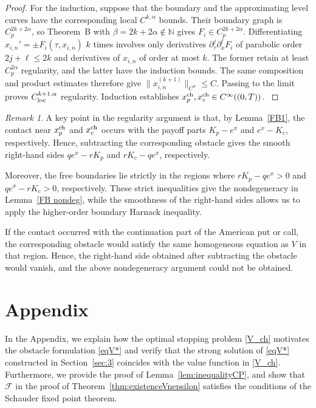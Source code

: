 \documentclass[11pt, a4paper, leqno]{amsart}
\numberwithin{equation}{section}
\theoremstyle{plain}
\theoremstyle{definition}
\theoremstyle{remark}
\newtheorem{remark}[theorem]{Remark}
\def\leq{\leqslant}
\begin{document}
{\begin{proof}
{For the induction, suppose that the boundary and the approximating
level curves have the corresponding local $C^{k,\alpha}$ bounds.
Their boundary graph is $C_p^{2k+2\alpha}$, so Theorem~B with
$\beta=2k+2\alpha\notin\mathbb N$ gives
$F_i\in C_p^{2k+2\alpha}$. Differentiating
$x_{i,n}'=\pm F_i(\tau,x_{i,n})$ $k$ times involves only
derivatives $\partial_\tau^j\partial_x^\ell F_i$ of parabolic
order $2j+\ell\leq2k$ and derivatives of $x_{i,n}$ of order
at most $k$. The former retain at least $C_p^{2\alpha}$
regularity, and the latter have the induction bounds. The same
composition and product estimates therefore give
$\|x_{i,n}^{(k+1)}\|_{C^\alpha}\leq C$.
Passing to the limit proves $C^{k+1,\alpha}_{\rm loc}$ regularity.
Induction establishes $x_p^{\rm ch},x_c^{\rm ch}\in C^\infty((0,T))$.
}
\label{rev:smooth-end}
\end{proof}

{
\begin{remark}
A key point in the regularity argument is that, by
Lemma~\ref{FB1}, the contact near $x_p^{\rm ch}$ and
$x_c^{\rm ch}$ occurs with the payoff parts $K_p-e^x$ and
$e^x-K_c$, respectively. Hence, subtracting the corresponding
obstacle gives the smooth right-hand sides $qe^x-rK_p$ and
$rK_c-qe^x$, respectively.

Moreover, the free boundaries lie strictly in the regions where
$rK_p-qe^x>0$ and $qe^x-rK_c>0$, respectively. These strict
inequalities give the nondegeneracy in Lemma~\ref{FB nondeg}, while
the smoothness of the right-hand sides allows us to apply the
higher-order boundary Harnack inequality.

If the contact occurred with the continuation part of the American
put or call, the corresponding obstacle would satisfy the same
homogeneous equation as $V$ in that region. Hence, the right-hand
side obtained after subtracting the obstacle would vanish, and the
above nondegeneracy argument could not be obtained.
\end{remark}
}


} %

\section*{Appendix}

In the Appendix,
we {
explain how the optimal stopping problem \eqref{V_ch} motivates the
obstacle formulation \eqref{eqV*}
} and
verify that the {strong }solution of \eqref{eqV*}
{
constructed in Section~\ref{sec:3} coincides with the value function in
}
\eqref{V_ch}.
Furthermore, we provide the proof of
Lemma~\ref{lem:inequalityCP}, and show that $\mathcal F$ in the proof
of Theorem~\ref{thm:existenceVnepsilon} satisfies the conditions of
the Schauder fixed point theorem.
\end{document}
